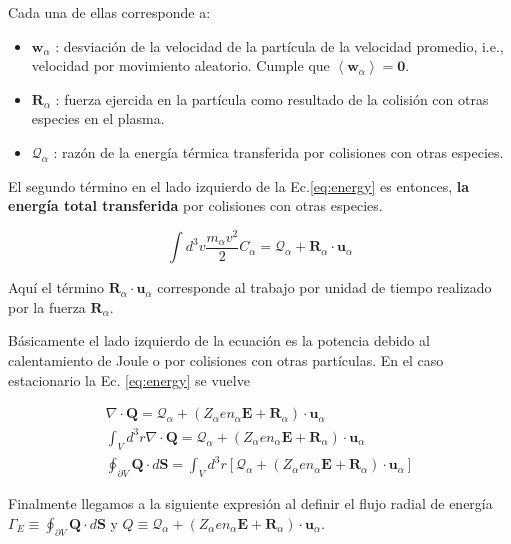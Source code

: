 \documentclass[11pt]{article}
\theoremstyle{definition}
\begin{document}
  Cada una de ellas corresponde a:
  \begin{itemize}
    \item $\textbf{w}_\alpha$ : desviaci\'on de la velocidad de la part\'icula de la velocidad promedio, i.e., velocidad por movimiento aleatorio. Cumple que $\left<\textbf{w}_\alpha\right> = \textbf{0}$.
    \item $\textbf{R}_\alpha$ : fuerza ejercida en la part\'icula como resultado de la colisi\'on con otras especies en el plasma.
    \item $\mathcal{Q}_\alpha$ : raz\'on de la energ\'ia t\'ermica transferida por colisiones con otras especies. 
  \end{itemize}

  El segundo t\'ermino en el lado izquierdo de la Ec.\eqref{eq:energy} es entonces, \textbf{la energ\'ia total transferida} por colisiones con otras especies.

  \begin{equation}
     \int d^3v \frac{m_\alpha v^2}{2}C_\alpha = \mathcal{Q}_\alpha + \textbf{R}_\alpha\cdot\textbf{u}_\alpha
  \end{equation}

  Aqu\'i el t\'ermino $\textbf{R}_\alpha\cdot\textbf{u}_\alpha$ corresponde al trabajo por unidad de tiempo realizado por la fuerza $\textbf{R}_\alpha$.

  B\'asicamente el lado izquierdo de la ecuaci\'on es la potencia debido al calentamiento de Joule o por colisiones con otras part\'iculas. En el caso estacionario la Ec. \eqref{eq:energy} se vuelve

  \begin{eqnarray}
  \nabla\cdot\textbf{Q} = \mathcal{Q}_\alpha + (Z_\alpha e n_\alpha\textbf{E} + \textbf{R}_\alpha)\cdot\textbf{u}_\alpha \nonumber\\
    \int_V d^3r \nabla\cdot\textbf{Q} = \mathcal{Q}_\alpha + (Z_\alpha e n_\alpha\textbf{E} + \textbf{R}_\alpha)\cdot\textbf{u}_\alpha\nonumber\\
    \oint_{\partial V} \textbf{Q}\cdot d\textbf{S} = \int_V d^3r\left[\mathcal{Q}_\alpha + (Z_\alpha e n_\alpha\textbf{E} + \textbf{R}_\alpha)\cdot\textbf{u}_\alpha\right] \nonumber
    \end{eqnarray}

    Finalmente llegamos a la siguiente expresi\'on al definir el flujo radial de energ\'ia $\Gamma_E \equiv \oint_{\partial V} \textbf{Q}\cdot d\textbf{S}$ y $Q \equiv \mathcal{Q}_\alpha + (Z_\alpha e n_\alpha\textbf{E} + \textbf{R}_\alpha)\cdot\textbf{u}_\alpha$.
\end{document}
